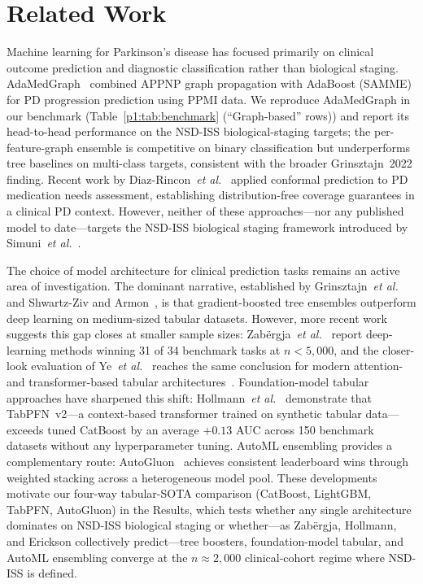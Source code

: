 \documentclass[10pt,letterpaper]{article}
\begin{document}
\section*{Related Work}
\label{p1:sec:related}

Machine learning for Parkinson's disease has focused primarily on clinical outcome prediction and diagnostic classification rather than biological staging. AdaMedGraph~\cite{adamedgraph} combined APPNP graph propagation with AdaBoost (SAMME) for PD progression prediction using PPMI data. We reproduce AdaMedGraph in our benchmark (Table~\ref{p1:tab:benchmark} (``Graph-based'' rows)) and report its head-to-head performance on the NSD-ISS biological-staging targets; the per-feature-graph ensemble is competitive on binary classification but underperforms tree baselines on multi-class targets, consistent with the broader Grinsztajn~2022 finding. Recent work by Diaz-Rincon~\textit{et al.}~\cite{diazrincon2025} applied conformal prediction to PD medication needs assessment, establishing distribution-free coverage guarantees in a clinical PD context. However, neither of these approaches---nor any published model to date---targets the NSD-ISS biological staging framework introduced by Simuni~\textit{et al.}~\cite{simuni2024}.

The choice of model architecture for clinical prediction tasks remains an active area of investigation. The dominant narrative, established by Grinsztajn~\textit{et al.}~\cite{grinsztajn2022} and Shwartz-Ziv and Armon~\cite{shwartzziv2022}, is that gradient-boosted tree ensembles outperform deep learning on medium-sized tabular datasets. However, more recent work suggests this gap closes at smaller sample sizes: Zab\"{e}rgja~\textit{et al.}~\cite{zabergja2024dltabular} report deep-learning methods winning 31 of 34 benchmark tasks at $n < 5{,}000$, and the closer-look evaluation of Ye~\textit{et al.}~\cite{ye2024closertabular} reaches the same conclusion for modern attention- and transformer-based tabular architectures~\cite{gorishniy2021revisiting}. Foundation-model tabular approaches have sharpened this shift: Hollmann~\textit{et al.}~\cite{hollmann2025tabpfn} demonstrate that TabPFN~v2---a context-based transformer trained on synthetic tabular data---exceeds tuned CatBoost by an average $+0.13$ AUC across 150 benchmark datasets without any hyperparameter tuning. AutoML ensembling provides a complementary route: AutoGluon~\cite{erickson2020autogluon} achieves consistent leaderboard wins through weighted stacking across a heterogeneous model pool. These developments motivate our four-way tabular-SOTA comparison (CatBoost, LightGBM, TabPFN, AutoGluon) in the Results, which tests whether any single architecture dominates on NSD-ISS biological staging or whether---as Zab\"{e}rgja, Hollmann, and Erickson collectively predict---tree boosters, foundation-model tabular, and AutoML ensembling converge at the $n \approx 2{,}000$ clinical-cohort regime where NSD-ISS is defined.
\end{document}
